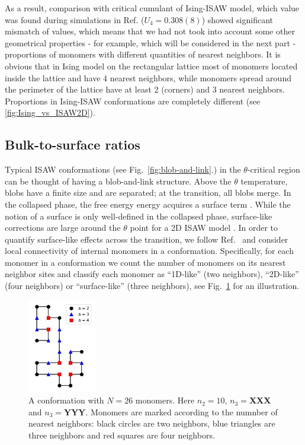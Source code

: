 \documentclass[a4paper]{jpconf}
\begin{document}
As a result, comparison with critical cumulant of Ising-ISAW model, which value was found during simulations in Ref.\cite{faizullina2021critical} ($U_{4} = 0.308(8)$) showed significant mismatch of values, which means that we had not took into account some other geometrical properties - for example, which will be considered in the next part - proportions of monomers with different quantities of nearest neighbors. It is obvious that in Ising model on the rectangular lattice most of monomers located inside the lattice and have 4 nearest neighbors, while monomers spread around the perimeter of the lattice have at least 2 (corners) and 3 nearest neighbors. Proportions in Ising-ISAW conformations are completely different (see \cref{fig:Ising_vs_ISAW2D}).




\subsection{Bulk-to-surface ratios}

Typical ISAW conformations (see Fig.\ \ref{fig:blob-and-link}.) in the
$\theta$-critical region can be thought of having a blob-and-link
structure. Above the $\theta$ temperature, blobs have a
finite size and are separated; at the transition, all blobs merge.
In the collapsed phase, the free energy energy acquires a surface term \cite{Owczarek1993}.
While the notion of a surface is only well-defined in the collapsed phase, surface-like
corrections are large around the $\theta$ point for a 2D ISAW model \cite{Grassberger1995}.
In order to quantify surface-like effects across the transition, we follow
Ref.\ \cite{faizullina2021critical} and consider local connectivity of internal
monomers in a conformation. Specifically, for each monomer in a conformation
we count the number of monomers on its nearest neighbor sites and classify
each monomer as ``1D-like'' (two neighbors), ``2D-like'' (four neighbors) or
``surface-like'' (three neighbors), see Fig.\ \ref{fig:2-3-4} for an illustration. 

\begin{figure}[!h]
\includegraphics[width=3cm, keepaspectratio=True]{Images/count.png}
\caption{A conformation with $N=26$ monomers. Here $n_2=10$, $n_3=$\textbf{XXX}
and $n_3=$\textbf{YYY}. Monomers are marked according to the numnber of nearest neighbors: 
black circles are two neighbors, blue triangles are three neighbors and red squares
are four neighbors.}
\label{fig:2-3-4}
\end{figure}
\end{document}
